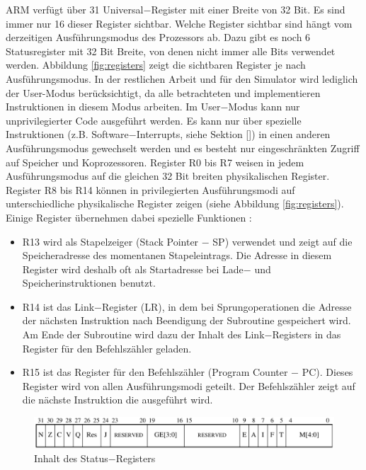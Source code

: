 \documentclass[a4paper, 11pt, onecolumn]{article}
\begin{document}
ARM verfügt über 31 Universal$-$Register mit einer Breite von 32 Bit. Es sind immer nur 16 dieser Register sichtbar. Welche Register sichtbar sind hängt vom derzeitigen Ausführungsmodus des Prozessors ab. Dazu gibt es noch 6 Statusregister mit 32 Bit Breite, von denen nicht immer alle Bits verwendet werden. Abbildung \ref{fig:registers} zeigt die sichtbaren Register je nach Ausführungsmodus. In der restlichen Arbeit und für den Simulator wird lediglich der User-Modus berücksichtigt, da alle betrachteten und implementieren Instruktionen in diesem Modus arbeiten. Im User$-$Modus kann nur unprivilegierter Code ausgeführt werden. Es kann nur über spezielle Instruktionen (z.B. Software$-$Interrupts, siehe Sektion []) in einen anderen Ausführungsmodus gewechselt werden und es besteht nur eingeschränkten Zugriff auf Speicher und Koprozessoren. Register R0 bis R7 weisen in jedem Ausführungsmodus auf die gleichen 32 Bit breiten physikalischen Register. Register R8 bis R14 können in privilegierten Ausführungsmodi auf unterschiedliche physikalische Register zeigen (siehe Abbildung \ref{fig:registers}). Einige Register übernehmen dabei spezielle Funktionen \cite{arm:2005}:

\begin{itemize}
\item R13 wird als Stapelzeiger (Stack Pointer $-$ SP) verwendet und zeigt auf die Speicheradresse des momentanen Stapeleintrags. Die Adresse in diesem Register wird deshalb oft als Startadresse bei Lade$-$ und Speicherinstruktionen benutzt.
\item R14 ist das Link$-$Register (LR), in dem bei Sprungoperationen die Adresse der nächsten Instruktion nach Beendigung der Subroutine gespeichert wird. Am Ende der Subroutine wird dazu der Inhalt des Link$-$Registers in das Register für den Befehlszähler geladen.
\item R15 ist das Register für den Befehlszähler (Program Counter $-$ PC). Dieses Register wird von allen Ausführungsmodi geteilt. Der Befehlszähler zeigt auf die nächste Instruktion die ausgeführt wird.
\end{itemize}

\begin{figure}[!htb]
\centering
\includegraphics[width=1\textwidth]{data/statusregister}
\caption{Inhalt des Status$-$Registers \cite{arm:2005}}
\label{fig:statusregister}
\end{figure}
\end{document}
